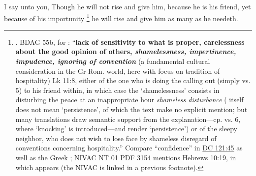 			I say unto you, Though he will not rise and give him, because he is his friend, yet because of his importunity%
				\footnote{%
					. BDAG 55b, for : ``\textbf{lack of sensitivity to what is proper, carelessness about the good opinion of others, \textit{shamelessness, impertinence, impudence, ignoring of convention}} (a fundamental cultural consideration in the Gr-Rom. world, here with focus on tradition of hospitality) Lk 11:8, either of the one who is doing the calling out (simply  vs. 5) to his friend within, in which case the `shamelessness' consists in disturbing the peace at an inappropriate hour \textit{shameless disturbance} ( itself does not mean `persistence', of which the text make no explicit mention; but many translations draw semantic support from the explanation---cp. vs. 6, where `knocking' is introduced---and render `persistence') or of the sleepy neighbor, who does not wish to lose face by shameless disregard of conventions concerning hospitality.'' Compare ``confidence'' in \hyperref[DC121-45]{DC 121:45} as well as the Greek ; NIVAC NT 01 PDF 3154 mentions \hyperref[HEBREWS-10-19]{Hebrews 10:19}, in which  appears (the NIVAC is linked in a previous footnote).
					}
			he will rise and give him as many as he needeth.

			\begin{framed}
			\scriptsize
				\begin{compactdesc}
					\item[SBLG] 
				\end{compactdesc}
			\end{framed}

